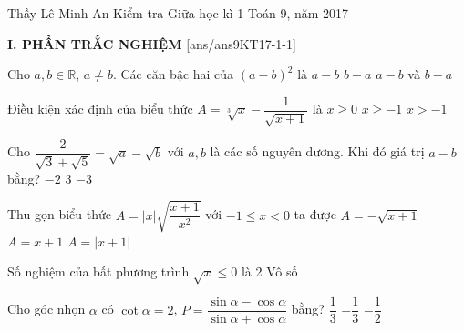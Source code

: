\begin{name}
{Thầy  Lê Minh An}
{Kiểm tra Giữa học kì 1 Toán 9, năm 2017}
\end{name}
\noindent\textbf{I. PHẦN TRẮC NGHIỆM}
\setcounter{ex}{0}
[ans/ans9KT17-1-1]
\begin{ex}%
Cho $a,b\in\mathbb{R}$, $a\neq b$. Các căn bậc hai của $(a-b)^2$ là
{$a-b$}
{$b-a$}
{\True $a-b$ và $b-a$}
\end{ex}

\begin{ex}%
Điều kiện xác định của biểu thức $A=\sqrt[3]{x}-\dfrac{1}{\sqrt{x+1}}$ là
{$x\ge 0$}
{$x\ge -1$}
{\True $x>-1$}
\end{ex}

\begin{ex}%
Cho $\dfrac{2}{\sqrt{3}+\sqrt{5}}=\sqrt{a}-\sqrt{b}$ với $a,b$ là các số nguyên dương. Khi đó giá trị $a-b$ bằng?
{$-2$}
{$3$}
{$-3$}
\end{ex}

\begin{ex}%
Thu gọn biểu thức $A=|x|\sqrt{\dfrac{x+1}{x^2}}$ với $-1\le x< 0$ ta được
{$A=-\sqrt{x+1}$}
{$A=x+1$}
{$A=|x+1|$}
\end{ex}

\begin{ex}%
Số nghiệm của bất phương trình $\sqrt{x}\le 0$ là
{}
{2}
{Vô số}
\end{ex}

\begin{ex}%
Cho góc nhọn $\alpha$ có $\cot\alpha=2$, $P=\dfrac{\sin\alpha-\cos\alpha}{\sin\alpha+\cos\alpha}$ bằng?
{$\dfrac{1}{3}$}
{\True $-\dfrac{1}{3}$}
{$-\dfrac{1}{2}$}
\end{ex}

